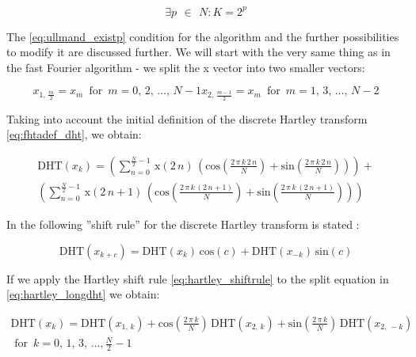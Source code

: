 \documentclass[12pt,twoside,a4paper]{article}
\numberwithin{equation}{subsection}
\numberwithin{figure}{subsection}
\begin{document}
\begin{equation} \label{eq:ullmand_existp}
  \exists p\,\ \in\ \,N : K=2^{p}
\end{equation}


The \ref{eq:ullmand_existp} condition for the algorithm and the further possibilities to modify it are discussed further. We will
start with the very same thing as in the fast Fourier algorithm - we split the x vector into two smaller vectors:

\begin{subequations} \label{eq:hartley_smallervectors}
  \begin{equation}   \label{eq:hsvs_even}
    {x_{1, \,\frac {m}{2}}}={x_{m}}\, \mbox{ for }\, m=0, \,2,\,\ldots,\,N - 1
  \end{equation}
  \begin{equation}   \label{eq:hsvs_odd}
    {x_{2, \,\frac {m - 1}{2}}}={x_{m}}\, \mbox{ for }\, m=1, \,3,\,\ldots,\,N - 2
  \end{equation}
\end{subequations}

Taking into account the initial definition of the discrete Hartley transform \ref{eq:fhtadef_dht}, we obtain:

\begin{multline}  \label{eq:hartley_longdht}
 \mathrm{DHT}({x_{k}})= \left(  \! \sum_{n=0}^{\frac {N}{2} - 1}\,\mathrm{x}(2\,n)\,(\mathrm{cos}(\frac {2\,\pi \,k\,2\,n}{N}) +
 \mathrm{sin}(\frac {2\,\pi \,k\,2\,n}{N})) \! \right)  + \\
 \left(  \! \sum_{n=0}^{\frac {N}{2} - 1}\,\mathrm{x}(2\,n +
 1)\,(\mathrm{cos}(\frac {2\,\pi \,k\,(2\,n + 1)}{N}) + \mathrm{sin}(\frac {2\,\pi \,k\,(2\,n + 1)}{N})) \! \right)
\end{multline}

In \cite{ullmann_algorithm} the following ''shift rule'' for the discrete Hartley transform is stated :

\begin{equation} \label{eq:hartley_shiftrule}
  \mathrm{DHT}({x_{k + c}})=\mathrm{DHT}({x_{k}})\,\mathrm{cos}(c)
 + \mathrm{DHT}({x_{ - k}})\,\mathrm{sin}(c)
\end{equation}

If we apply the Hartley shift rule  \ref{eq:hartley_shiftrule} to the split equation in \ref{eq:hartley_longdht} we obtain:

\begin{multline} \label{eq:hartley_srapplied}
  \mathrm{DHT}({x_{k}})=\mathrm{DHT}({x_{1, \,k}}) + \mathrm{cos}(\frac {2\,\pi \,k}{N})\,\mathrm{DHT}({x_{2, \,k}}) +
  \mathrm{sin}(\frac {2\,\pi \,k}{N})\,\mathrm{DHT}({x_{2, \, - k}})\, \\
  \mbox{ for }\,k=0, \,1, \,3,\,\ldots,\frac {N}{2} - 1
\end{multline}
\end{document}
